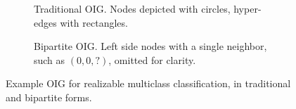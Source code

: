 \begin{figure}[tbp]
    \centering
    \begin{subfigure}[b]{0.45\textwidth}
        \centering
        
        \caption{Traditional OIG. Nodes depicted with circles,  hyper-edges with rectangles.}
        \label{fig:oig}
    \end{subfigure}
    \hfill %
    \begin{subfigure}[b]{0.45\textwidth}
        \centering
        
        \caption{Bipartite OIG. Left side nodes with a single neighbor, such as $(0,0,?)$, omitted for clarity.}
        \label{fig:bpoig}
    \end{subfigure}
    \caption{Example OIG for realizable multiclass classification, in traditional and bipartite forms.}
    \label{fig:bothoig}
\end{figure}




